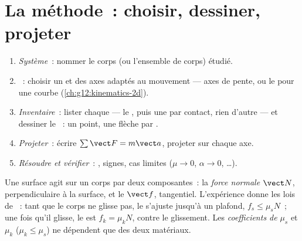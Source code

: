 \section{La méthode~: choisir, dessiner, projeter}

\begin{method}\label{met:g12:newtons-laws:method}
\begin{enumerate}
  \item \emph{Système}~: nommer le corps (ou l'ensemble de corps) étudié.
  \item \emph{}~: choisir un  et des axes
        adaptés au mouvement --- axes de pente, ou le
         pour une courbe
        (\cref{ch:g12:kinematics-2d}).
  \item \emph{Inventaire}~: lister chaque  --- le
        , puis une  par
        contact, rien d'autre --- et dessiner le ~:
        un point, une flèche par .
  \item \emph{Projeter}~: écrire $\sum \vect F = m\vect a$, projeter sur
        chaque axe.
  \item \emph{Résoudre et vérifier}~: , signes, cas
        limites ($\mu \to 0$, $\alpha \to 0$, \dots).
\end{enumerate}
\end{method}

\begin{definition}\label{def:g12:newtons-laws:friction}
Une surface agit sur un corps par deux composantes~: la \emph{force
normale} $\vect N$, perpendiculaire à la surface,
et le  $\vect f$, tangentiel. L'expérience donne les
lois de ~: tant que le corps ne glisse pas, le
 s'ajuste jusqu'à un plafond,
$f_s \leq \mu_s N$~; une fois qu'il glisse, le
 est $f_k = \mu_k N$, contre le
glissement. Les \emph{coefficients de }%
 $\mu_s$ et $\mu_k$
($\mu_k \leq \mu_s$) ne dépendent que des deux matériaux.
\end{definition}

